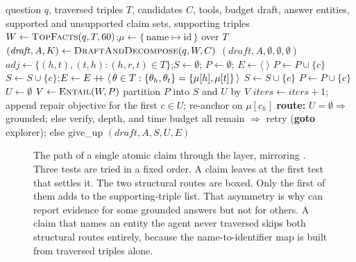 \begin{algorithm}[!tb]
  \caption{Structural verification of a draft}
  \label{alg:verify}
  \begin{algorithmic}[1]
    \REQUIRE question $q$, traversed triples $T$, candidates $C$, tools, budget
    \ENSURE draft, answer entities, supported and unsupported claim sets,
    supporting triples \STATE $W \gets \textsc{TopFacts}(q, T, 60)$;\quad $\mu
    \gets \{\,\text{name} \mapsto \text{id}\,\}$ over $T$  \STATE $(\mathit{draft}, A, K) \gets
    \textsc{DraftAndDecompose}(q, W, C)$ 
     \RETURN $(\mathit{draft}, A,
    \emptyset, \emptyset, \emptyset)$  \ENDIF \STATE $\mathit{adj} \gets \{(h,t),(t,h) : (h,r,t) \in
    T\}$;\quad $S \gets \emptyset$;\; $P \gets \emptyset$;\; $E \gets
    \langle\;\rangle$   
    \STATE $P \gets P \cup \{c\}$   \STATE $S \gets S
    \cup \{c\}$;\quad $E \gets E \mathbin{+\mkern-6mu+} \langle\,\theta \in T :
    \{\theta_h,\theta_t\} = \{\mu[h],\mu[t]\}\,\rangle$  
    \STATE $S \gets S \cup \{c\}$  \ELSE \STATE $P \gets P \cup \{c\}$ \ENDIF \ENDFOR \STATE $U \gets
    \emptyset$  \STATE $V \gets \textsc{Entail}(W, P)$
     \STATE partition $P$ into $S$ and $U$ by $V$ \ENDIF {} \STATE $\mathit{iters} \gets
    \mathit{iters} + 1$; append repair objective for the first $c \in U$;
    re-anchor on $\mu[c_h]$ \ENDIF \STATE \textbf{route:} $U = \emptyset
    \Rightarrow$ \textsf{grounded}; else verify, depth, and time budget all
    remain $\Rightarrow$ \textsf{retry} (\textbf{goto} explorer); else
    \textsf{give\_up} \RETURN $(\mathit{draft}, A, S, U, E)$
  \end{algorithmic}
\end{algorithm}

\begin{figure}[!tbp]
  \begin{center}
    
  \end{center}
  \caption[The path of one claim through the verification layer]{The path of a
  single atomic claim through the layer, mirroring . Three
  tests are tried in a fixed order. A claim leaves at the first test that
  settles it. The two structural routes are boxed. Only the first of them adds
  to the supporting-triple list. That asymmetry is why
   can report evidence for some grounded answers but
  not for others. A claim that names an entity the agent never traversed skips
  both structural routes entirely, because the name-to-identifier map is built
  from traversed triples alone.}
  \label{fig:claim-path}
\end{figure}

